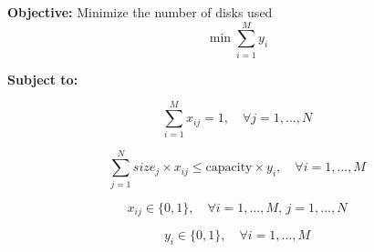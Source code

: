 \documentclass{article}
\begin{document}
\textbf{Objective:} Minimize the number of disks used
\begin{equation}
\min \sum_{i=1}^{M} y_i
\end{equation}

\textbf{Subject to:}

\begin{equation}
\sum_{i=1}^{M} x_{ij} = 1, \quad \forall j=1,...,N
\end{equation}

\begin{equation}
\sum_{j=1}^{N} size_{j} \times x_{ij} \leq \text{capacity} \times y_i, \quad \forall i=1,...,M
\end{equation}

\begin{equation}
x_{ij} \in \{0, 1\}, \quad \forall i=1,...,M, \, j=1,...,N
\end{equation}

\begin{equation}
y_i \in \{0, 1\}, \quad \forall i=1,...,M
\end{equation}
\end{document}
